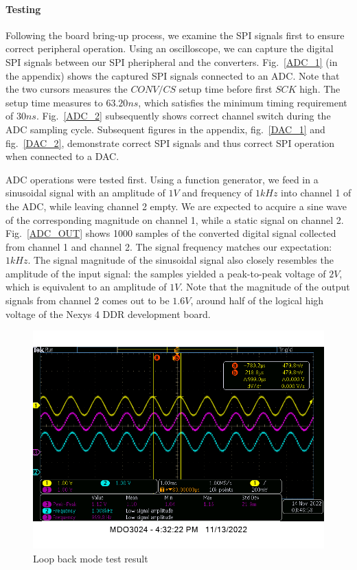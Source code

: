 \documentclass[conference]{IEEEtran}
\begin{document}
\paragraph{Testing}Following the board bring-up process, we examine the SPI signals first to ensure correct peripheral operation. Using an oscilloscope, we can capture the digital SPI signals between our SPI pheripheral and the converters. Fig.~\ref{ADC_1} (in the appendix) shows the captured SPI signals connected to an ADC. Note that the two cursors measures the $CONV/CS$ setup time before first $SCK$ high. The setup time measures to $63.20ns$, which satisfies the minimum timing requirement of $30ns$. Fig.~\ref{ADC_2} subsequently shows correct channel switch during the ADC sampling cycle. Subsequent figures in the appendix, fig.~\ref{DAC_1} and fig.~\ref{DAC_2}, demonstrate correct SPI signals and thus correct SPI operation when connected to a DAC. 

ADC operations were tested first. Using a function generator, we feed in a sinusoidal signal with an amplitude of $1V$ and frequency of $1kHz$ into channel 1 of the ADC, while leaving channel 2 empty. We are expected to acquire a sine wave of the corresponding magnitude on channel 1, while a static signal on channel 2. Fig.~\ref{ADC_OUT} shows 1000 samples of the converted digital signal collected from channel 1 and channel 2. The signal frequency matches our expectation: $1kHz$. The signal magnitude of the sinusoidal signal also closely resembles the amplitude of the input signal: the samples yielded a peak-to-peak voltage of $2V$, which is equivalent to an amplitude of $1V$. Note that the magnitude of the output signals from channel 2 comes out to be $1.6V$, around half of the logical high voltage of the Nexys\texttrademark{} 4 DDR development board.

\begin{figure}[htbp]
    \centerline{\includegraphics[width=\linewidth]{Figures/SPI/loop_back.png}}
    \caption{Loop back mode test result}
    \label{LOOP_BACK}
\end{figure}
\end{document}
